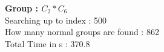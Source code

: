 \textbf{Group : $C_2*C_6$}\\
Searching up to index : 500\\
How many normal groups are found : 862\\
Total Time in s : 370.8\\
